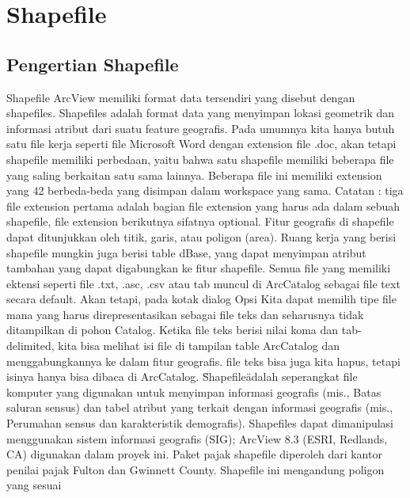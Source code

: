 

\section{Shapefile}
\subsection{Pengertian Shapefile}
Shapefile ArcView memiliki format data tersendiri yang disebut dengan shapefiles. 
Shapefiles adalah format data yang menyimpan lokasi geometrik dan informasi atribut dari suatu feature geografis. 
Pada umumnya kita hanya butuh satu file kerja seperti file Microsoft Word dengan extension file .doc, 
akan tetapi shapefile memiliki perbedaan, yaitu bahwa satu shapefile memiliki beberapa file yang saling berkaitan satu sama lainnya. 
Beberapa file ini memiliki extension yang 42 berbeda-beda yang disimpan dalam workspace yang sama.
Catatan : tiga file extension pertama adalah bagian file extension yang harus ada dalam sebuah shapefile, file extension berikutnya sifatnya optional. \cite{surya2013sistem}
Fitur geografis di shapefile dapat ditunjukkan oleh titik, garis, atau poligon (area). Ruang kerja yang berisi shapefile
mungkin juga berisi table dBase, yang dapat menyimpan atribut tambahan yang dapat digabungkan ke fitur shapefile.
Semua file yang memiliki ektensi seperti file .txt, .asc, .csv atau tab muncul di ArcCatalog sebagai file text secara default.
Akan tetapi, pada kotak dialog Opsi Kita dapat memilih tipe file mana yang harus direpresentasikan sebagai file
teks dan seharusnya tidak ditampilkan di pohon Catalog. Ketika file teks berisi nilai koma dan tab-delimited,
kita bisa melihat isi file di tampilan table ArcCatalog dan menggabungkannya ke dalam fitur geografis. file teks bisa juga kita hapus, tetapi isinya hanya bisa dibaca di ArcCatalog.
\"Shapefile\" adalah seperangkat file komputer yang digunakan untuk menyimpan informasi geografis (mis., Batas saluran sensus) 
dan tabel atribut yang terkait dengan informasi geografis (mis., Perumahan sensus dan karakteristik demografis). Shapefiles dapat 
dimanipulasi menggunakan sistem informasi geografis (SIG); ArcView 8.3 (ESRI, Redlands, CA) digunakan dalam proyek ini. 
Paket pajak shapefile diperoleh dari kantor penilai pajak Fulton dan Gwinnett County. Shapefile ini mengandung poligon yang sesuai 
